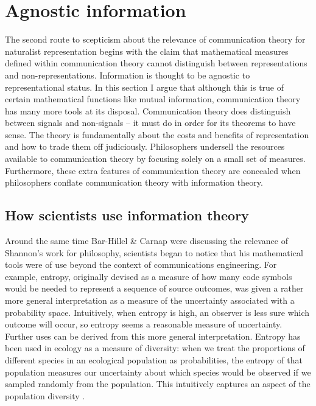 \section{Agnostic information}\label{sec:agnostic}

The second route to scepticism about the relevance of communication theory for naturalist representation begins with the claim that mathematical measures defined within communication theory cannot distinguish between representations and non-representations.
Information is thought to be agnostic to representational status.
In this section I argue that although this is true of certain mathematical functions like mutual information, communication theory has many more tools at its disposal.
Communication theory does distinguish between signals and non-signals -- it must do in order for its theorems to have sense.
The theory is fundamentally about the costs and benefits of representation and how to trade them off judiciously.
Philosophers undersell the resources available to communication theory by focusing solely on a small set of measures.
Furthermore, these extra features of communication theory are concealed when philosophers conflate communication theory with information theory.

\subsection{How scientists use information theory}\label{subsec:scientists}

Around the same time Bar-Hillel \& Carnap were discussing the relevance of Shannon's work for philosophy, scientists began to notice that his mathematical tools were of use beyond the context of communications engineering.
For example, entropy, originally devised as a measure of how many code symbols would be needed to represent a sequence of source outcomes, was given a rather more general interpretation as a measure of the uncertainty associated with a probability space.
Intuitively, when entropy is high, an observer is less sure which outcome will occur, so entropy seems a reasonable measure of uncertainty.
Further uses can be derived from this more general interpretation.
Entropy has been used in ecology as a measure of diversity: when we treat the proportions of different species in an ecological population as probabilities, the entropy of that population measures our uncertainty about which species would be observed if we sampled randomly from the population.
This intuitively captures an aspect of the population diversity \citep{margalef1957information}.

